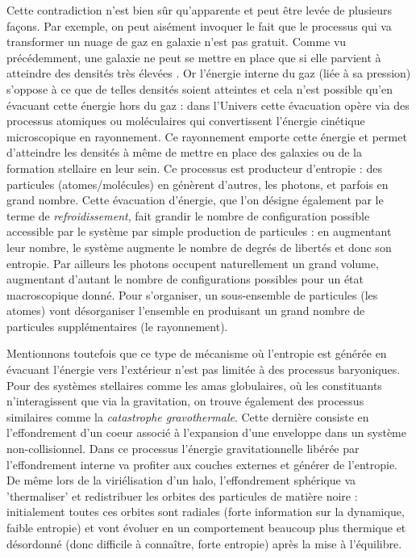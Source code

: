 Cette contradiction n'est bien sûr qu'apparente et peut être levée de plusieurs façons. Par exemple, on peut aisément invoquer le fait que le processus qui va transformer un nuage de gaz en galaxie n'est pas gratuit. Comme vu précédemment, une galaxie ne peut se mettre en place que si elle parvient à atteindre des densités très élevées . Or l'énergie interne du gaz (liée à sa pression) s'oppose à ce que de telles densités soient atteintes et cela n'est possible qu'en évacuant cette énergie hors du gaz : dans l'Univers cette évacuation opère via des processus atomiques ou moléculaires qui convertissent l'énergie cinétique microscopique en rayonnement. Ce rayonnement emporte cette énergie et permet d'atteindre les densités à même de mettre en place des galaxies ou de la formation stellaire en leur sein. Ce processus est producteur d'entropie : des particules (atomes/molécules) en génèrent d'autres, les photons, et parfois en grand nombre. Cette évacuation d'énergie, que l'on désigne également par le terme de \textit{refroidissement}, fait grandir le nombre de configuration possible accessible par le système par simple production de particules : en augmentant leur nombre, le système augmente le nombre de degrés de libertés et donc son entropie. Par ailleurs les photons occupent naturellement un grand volume, augmentant d'autant le nombre de configurations possibles pour un état macroscopique donné.  Pour s'organiser, un sous-ensemble de particules (les atomes) vont désorganiser l'ensemble en produisant un grand nombre de particules supplémentaires (le rayonnement).

Mentionnons toutefois que ce type de mécanisme où l'entropie est générée en évacuant l'énergie vers l'extérieur n'est pas limitée à des processus baryoniques. Pour des systèmes stellaires comme les amas globulaires, où les constituants n'interagissent que via la gravitation, on trouve également des processus similaires comme la \textit{catastrophe gravothermale}. Cette dernière consiste en l'effondrement d'un coeur associé à l'expansion d'une enveloppe dans un système non-collisionnel. Dans ce processus l'énergie gravitationnelle libérée par l'effondrement interne va profiter aux couches externes et générer de l'entropie. De même lors de la viriélisation d'un halo, l'effondrement sphérique va 'thermaliser' et redistribuer les orbites des particules de matière noire : initialement toutes ces orbites sont radiales (forte information sur la dynamique, faible entropie) et vont évoluer en un comportement beaucoup plus thermique et désordonné (donc difficile à connaître, forte entropie) après la mise à l'équilibre.

